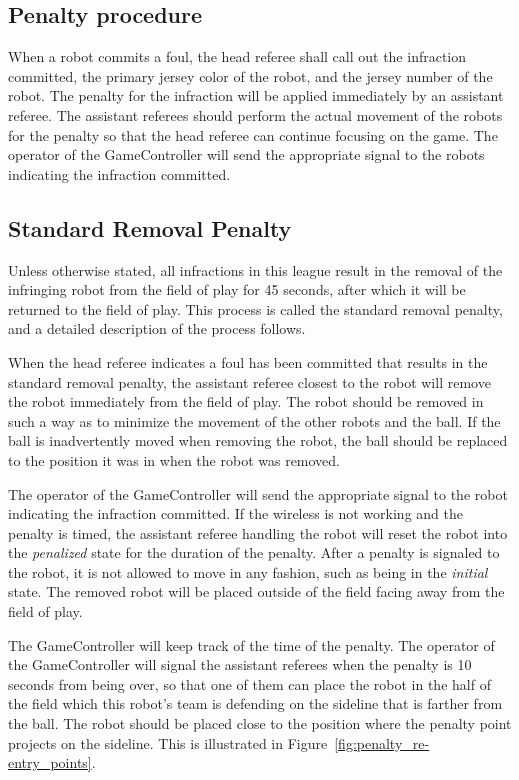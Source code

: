 \documentclass[12pt]{article}
\begin{document}
\subsection{Penalty procedure}
\label{sec:penalty_procedure}

When a robot commits a foul, the head referee shall call out the infraction committed, the primary jersey color of the robot, and the jersey number of the robot. The penalty for the infraction will be applied immediately by an assistant referee. The assistant referees should perform the actual movement of the robots for the penalty so that the head referee can continue focusing on the game. The operator of the GameController will send the appropriate signal to the robots indicating the infraction committed.

\subsection{Standard Removal Penalty}
\label{sec:removal_penalty}

Unless otherwise stated, all infractions in this league result in the removal of the infringing robot from the field of play for 45 seconds, after which it will be returned to the field of play. This process is called the standard removal penalty, and a detailed description of the process follows.

When the head referee indicates a foul has been committed that results in the standard removal penalty, the assistant referee closest to the robot will remove the robot immediately from the field of play. The robot should be removed in such a way as to minimize the movement of the other robots and the ball. If the ball is inadvertently moved when removing the robot, the ball should be replaced to the position it was in when the robot was removed.

The operator of the GameController will send the appropriate signal to the robot indicating the infraction committed. If the wireless is not working and the penalty is timed, the assistant referee handling the robot will reset the robot into the \emph{penalized} state for the duration of the penalty. After a penalty is signaled to the robot, it is not allowed to move in any fashion, such as being in the \emph{initial} state. The removed robot will be placed outside of the field facing away from the field of play.

The GameController will keep track of the time of the penalty. The operator of the GameController will signal the assistant referees when the penalty is 10 seconds from being over, so that one of them can place the robot in the half of the field which this robot's team is defending on the sideline that is farther from the ball. The robot should be placed close to the position where the penalty point projects on the sideline. This is illustrated in Figure~\ref{fig:penalty_re-entry_points}. 
\end{document}
